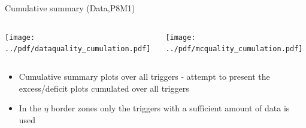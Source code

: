 \documentclass[9pt]{beamer}
\begin{document}
%


\begin{frame}[t]{Cumulative summary (Data,P8M1)}
\begin{columns}[T]
  \begin{column}{.5\textwidth}
  \texttt{[image: ../pdf/dataquality\_cumulation.pdf]}
  \end{column}
  \begin{column}{.5\textwidth}
  \texttt{[image: ../pdf/mcquality\_cumulation.pdf]}
  \end{column}
\end{columns}
\begin{itemize}
 \item Cumulative summary plots over all triggers - attempt to present the excess/deficit plots cumulated over all triggers
 \item In the $\eta$ border zones only the triggers with a sufficient amount of data is used
\end{itemize}
\end{frame}
\end{document}
